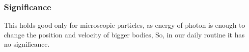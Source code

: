 \subsubsection{Significance}

This holds good only for microscopic particles, as energy of photon is enough to change the position and velocity of bigger bodies, So, in our daily routine it has no significance.


